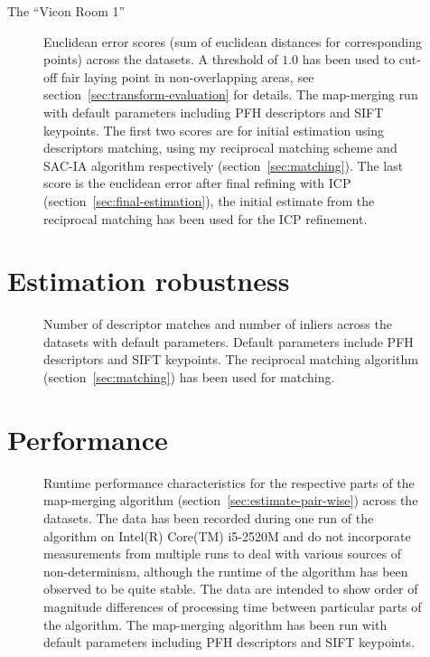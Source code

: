 The ``Vicon Room 1''

\begin{figure}
  \centering
  
  \caption{Euclidean error scores (sum of euclidean distances for corresponding points) across the datasets. A threshold of $1.0$ has been used to cut-off fair laying point in non-overlapping areas, see section~\ref{sec:transform-evaluation} for details. The map-merging run with default parameters including \gls{PFH} descriptors and \gls{SIFT} keypoints. The first two scores are for initial estimation using descriptors matching, using my reciprocal matching scheme and \gls{SAC-IA} algorithm respectively (section~\ref{sec:matching}). The last score is the euclidean error after final refining with \gls{ICP} (section~\ref{sec:final-estimation}), the initial estimate from the reciprocal matching has been used for the \gls{ICP} refinement.}
  \label{fig:plot:euc_dist}
\end{figure}

\section{Estimation robustness}

\begin{figure}
  \centering
  
  \caption{Number of descriptor matches and number of inliers across the datasets with default parameters. Default parameters include \gls{PFH} descriptors and \gls{SIFT} keypoints. The reciprocal matching algorithm (section~\ref{sec:matching}) has been used for matching.}
  \label{fig:plot:inliers}
\end{figure}

\section{Performance}

\begin{figure}
  \centering
  
  \caption{Runtime performance characteristics for the respective parts of the map-merging algorithm (section~\ref{sec:estimate-pair-wise}) across the datasets. The data has been recorded during one run of the algorithm on Intel(R) Core(TM) i5-2520M and do not incorporate measurements from multiple runs to deal with various sources of non-determinism, although the runtime of the algorithm has been observed to be quite stable. The data are intended to show order of magnitude differences of processing time between particular parts of the algorithm. The map-merging algorithm has been run with default parameters including \gls{PFH} descriptors and \gls{SIFT} keypoints.}
  \label{fig:plot:perf}
\end{figure}
